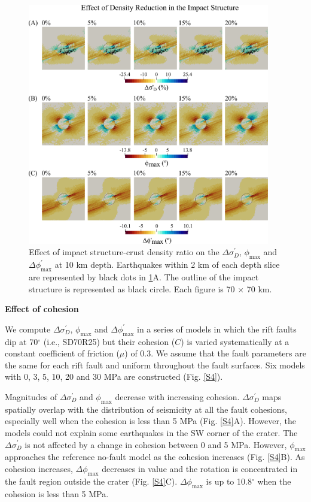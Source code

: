 \documentclass[draft,jgrga]{agutexSI2019}
\begin{document}
\begin{article}
\begin{figure}[ht]
\includegraphics[width=25pc]{Figures/effect_of_density.png}
\caption{Effect of impact structure-crust density ratio on the $\Delta\sigma_{D}^{\prime}$, $\phi_{\max}$ and $\Delta \phi_{\max}^{\prime}$ at 10 km depth. Earthquakes within 2 km of each depth slice are represented by black dots in \ref{S3}A. The outline of the impact structure is represented as black circle. Each figure is 70 $\times$ 70 km.}
\label{S3}
\end{figure}

\vspace{10mm} %

\noindent\textbf{Effect of cohesion}

We compute $\Delta \sigma_{D}^{\prime}$, $\phi_{\max}$ and $\Delta \phi_{\max}^{\prime}$ in a series of models in which the rift faults dip at 70$^{\circ}$ (i.e., SD70R25) but their cohesion ($C$) is varied systematically at a constant coefficient of friction ($\mu$) of 0.3. We assume that the fault parameters are the same for each rift fault and uniform throughout the fault surfaces. Six models with 0, 3, 5, 10, 20 and 30 MPa are constructed (Fig. \ref{S4}).

Magnitudes of $\Delta\sigma_D^{\prime}$ and $\phi_{\max}$ decrease with increasing cohesion. $\Delta\sigma_D^{\prime}$ maps spatially overlap with the distribution of seismicity at all the fault cohesions, especially well when the cohesion is less than 5 MPa (Fig. \ref{S4}A). However, the models could not explain some earthquakes in the SW corner of the crater. The $\Delta\sigma_D^{\prime}$ is not affected by a change in cohesion between 0 and 5 MPa. However, $\phi_{\max}$ approaches the reference no-fault model as the cohesion increases (Fig. \ref{S4}B). As cohesion increases, $\Delta\phi_{\max}$ decreases in value and the rotation is concentrated in the fault region outside the crater (Fig. \ref{S4}C). $\Delta\phi_{\max}$ is up to 10.8$^\circ$ when the cohesion is less than 5 MPa. 


\end{article}
\end{document}
